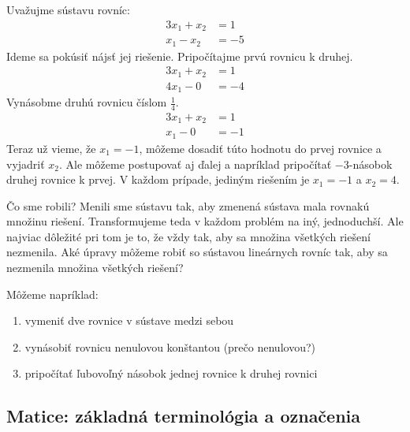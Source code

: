 \begin{example}\label{ex:malaSustava}
Uvažujme sústavu rovníc:
\begin{align*}
    3x_1 + x_2 &= 1 \\
    x_1 - x_2 &= -5
\end{align*}
Ideme sa pokúsiť nájsť jej riešenie. Pripočítajme prvú rovnicu k druhej.
\begin{align*}
    3x_1 + x_2 &= 1 \\
    4x_1 - 0 &= -4
\end{align*}
Vynásobme druhú rovnicu číslom $\frac{1}{4}$.
\begin{align*}
    3x_1 + x_2 &= 1 \\
    x_1 - 0 &= -1
\end{align*}
Teraz už vieme, že $x_1=-1$, môžeme dosadiť túto hodnotu do prvej rovnice
a vyjadriť $x_2$. Ale môžeme postupovať aj ďalej a napríklad pripočítať
$-3$-násobok druhej rovnice k prvej.
V každom prípade, jediným riešením je $x_1 = -1$ a $x_2 = 4$.
\end{example}

Čo sme robili? Menili sme sústavu tak, aby zmenená sústava mala rovnakú množinu
riešení. Transformujeme teda v každom problém na iný, jednoduchší. Ale najviac
dôležité pri tom je to, že vždy tak, aby sa množina všetkých riešení nezmenila.
Aké úpravy môžeme robiť so sústavou lineárnych rovníc tak, aby sa nezmenila množina
všetkých riešení?

Môžeme napríklad:
\begin{enumerate}
    \item vymeniť dve rovnice v sústave medzi sebou
    \item vynásobiť rovnicu nenulovou konštantou (prečo nenulovou?)
    \item pripočítať ľubovoľný násobok jednej rovnice k druhej rovnici
\end{enumerate}

\subsection{Matice: základná terminológia a označenia}


